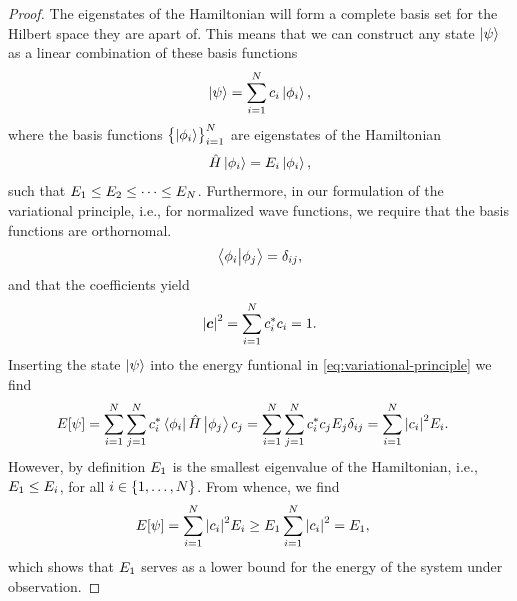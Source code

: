        \begin{proof}
            The eigenstates of the Hamiltonian will form a complete basis set
            for the Hilbert space they are apart of.
            This means that we can construct any state $\ket{\psi}$ as a linear
            combination of these basis functions
            \begin{align}
                \ket{\psi} = \sum_{i = 1}^{N} c_{i}\ket{\phi_i},
            \end{align}
            where the basis functions $\left\{ \ket{\phi_i} \right\}_{i = 1}^{N}$ are
            eigenstates of the Hamiltonian
            \begin{align}
                \hat{H}\ket{\phi_i} = E_i\ket{\phi_i},
            \end{align}
            such that $E_1 \leq E_2 \leq \dots \leq E_N$.
            Furthermore, in our formulation of the variational principle, i.e.,
            for normalized wave functions, we require that the basis functions
            are orthornomal.
            \begin{align}
                \braket{\phi_i}{\phi_j} = \delta_{ij},
            \end{align}
            and that the coefficients yield
            \begin{align}
                \abs{\boldsymbol{c}}^2 = \sum_{i = 1}^{N} c^{*}_{i}c_{i} = 1.
            \end{align}
            Inserting the state $\ket{\psi}$ into the energy funtional in
            \autoref{eq:variational-principle} we find
            \begin{align}
                E[\psi]
                &= \sum_{i = 1}^{N}\sum_{j = 1}^{N}
                c^{*}_i\bra{\phi_i}\hat{H}\ket{\phi_j}c_j
                = \sum_{i = 1}^{N}\sum_{j = 1}^{N}
                c^{*}_i c_j E_j\delta_{ij}
                = \sum_{i = 1}^{N}
                \abs{c_i}^2 E_i.
            \end{align}
            However, by definition $E_1$ is the smallest eigenvalue of the
            Hamiltonian, i.e., $E_1 \leq E_i$, for all $i \in
            \left\{ 1, \dots, N \right\}$.
            From whence, we find
            \begin{align}
                E[\psi]
                &= \sum_{i = 1}^{N}
                \abs{c_i}^2 E_i
                \geq
                E_1 \sum_{i = 1}^{N}
                \abs{c_i}^{2}
                = E_1,
            \end{align}
            which shows that $E_1$ serves as a lower bound for the energy
            of the system under observation.
        \end{proof}

